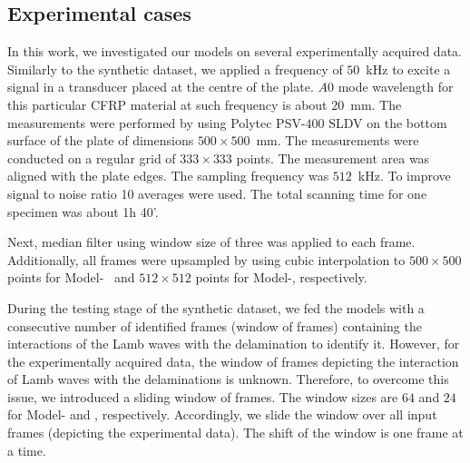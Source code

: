 \subsection{Experimental cases}
In this work, we investigated our models on several experimentally acquired data.
Similarly to the synthetic dataset, we applied a frequency of \(50\)~kHz to excite a signal in a transducer placed at the centre of the plate. 
\(A0\) mode wavelength for this particular CFRP material at such frequency is about \(20\)~mm. 
The measurements were performed by using Polytec PSV-\(400\) SLDV on the bottom surface of the plate of dimensions \(500\times500\)~mm. 
The measurements were conducted on a regular grid of \(333\times333\) points. 
The measurement area was aligned with the plate edges.
The sampling frequency was \(512\)~kHz.
To improve signal to noise ratio 10 averages were used.
The total scanning time for one specimen was about 1h 40'.

Next, median filter using window size of three was applied to each frame. Additionally, all frames were upsampled by using cubic interpolation to \(500 \times 500\) points for Model-~ and \(512\times512\) points for Model-, respectively.

During the testing stage of the synthetic dataset,  we fed the models with a consecutive number of identified frames (window of frames) containing the interactions of the Lamb waves with the delamination to identify it.
However, for the experimentally acquired data, the window of frames depicting the interaction of Lamb waves with the delaminations is unknown.
Therefore, to overcome this issue, we introduced a sliding window of frames. 
The window sizes are \(64\) and \(24\) for Model- and , respectively.
Accordingly, we slide the window over all input frames (depicting the experimental data).
The shift of the window is one frame at a time.
